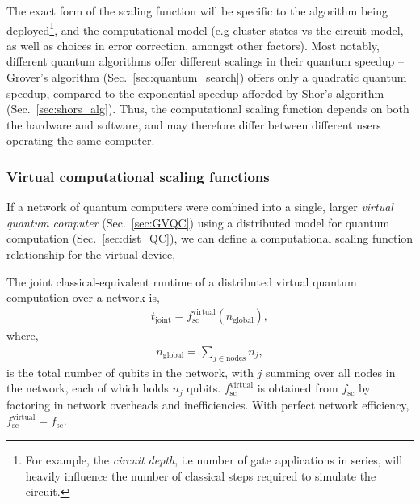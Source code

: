The exact form of the scaling function will be specific to the algorithm being deployed\footnote{For example, the \textit{circuit depth}, i.e number of gate applications in series, will heavily influence the number of classical steps required to simulate the circuit.}, and the computational model (e.g cluster states vs the circuit model, as well as choices in error correction, amongst other factors). Most notably, different quantum algorithms offer different scalings in their quantum speedup -- Grover's algorithm (Sec.~\ref{sec:quantum_search}) offers only a quadratic quantum speedup, compared to the exponential speedup afforded by Shor's algorithm (Sec.~\ref{sec:shors_alg}). Thus, the computational scaling function depends on both the hardware and software, and may therefore differ between different users operating the same computer.

%
%

\subsubsection{Virtual computational scaling functions}

If a network of quantum computers were combined into a single, larger \textit{virtual quantum computer} (Sec.~\ref{sec:GVQC}) using a distributed model for quantum computation (Sec.~\ref{sec:dist_QC}), we can define a computational scaling function relationship for the virtual device,

\begin{definition}
The joint classical-equivalent runtime of a distributed virtual quantum computation over a network is,
\begin{align}
t_\text{joint} = f_\text{sc}^\text{virtual}(n_\text{global}),
\end{align}
where,
\begin{align}
n_\text{global} = \sum_{j\in\text{nodes}} n_j,
\end{align}
is the total number of qubits in the network, with $j$ summing over all nodes in the network, each of which holds $n_j$ qubits. $f_\text{sc}^\text{virtual}$ is obtained from $f_\text{sc}$ by factoring in network overheads and inefficiencies. With perfect network efficiency, \mbox{$f_\text{sc}^\text{virtual}=f_\text{sc}$}.
\end{definition}


